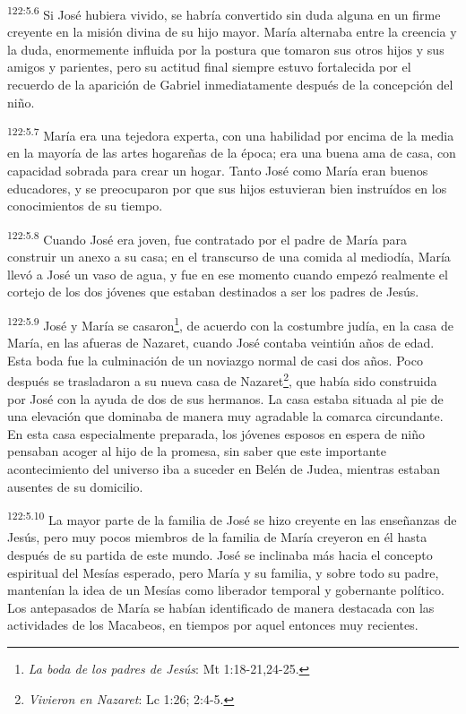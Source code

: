 \par
\textsuperscript{122:5.6} Si José hubiera vivido, se habría convertido sin duda alguna en un firme creyente en la misión divina de su hijo mayor. María alternaba entre la creencia y la duda, enormemente influida por la postura que tomaron sus otros hijos y sus amigos y parientes, pero su actitud final siempre estuvo fortalecida por el recuerdo de la aparición de Gabriel inmediatamente después de la concepción del niño.

\par
\textsuperscript{122:5.7} María era una tejedora experta, con una habilidad por encima de la media en la mayoría de las artes hogareñas de la época; era una buena ama de casa, con capacidad sobrada para crear un hogar. Tanto José como María eran buenos educadores, y se preocuparon por que sus hijos estuvieran bien instruídos en los conocimientos de su tiempo.

\par
\textsuperscript{122:5.8} Cuando José era joven, fue contratado por el padre de María para construir un anexo a su casa; en el transcurso de una comida al mediodía, María llevó a José un vaso de agua, y fue en ese momento cuando empezó realmente el cortejo de los dos jóvenes que estaban destinados a ser los padres de Jesús.

\par
\textsuperscript{122:5.9} José y María se casaron\footnote{\textit{La boda de los padres de Jesús}: Mt 1:18-21,24-25.}, de acuerdo con la costumbre judía, en la casa de María, en las afueras de Nazaret, cuando José contaba veintiún años de edad. Esta boda fue la culminación de un noviazgo normal de casi dos años. Poco después se trasladaron a su nueva casa de Nazaret\footnote{\textit{Vivieron en Nazaret}: Lc 1:26; 2:4-5.}, que había sido construida por José con la ayuda de dos de sus hermanos. La casa estaba situada al pie de una elevación que dominaba de manera muy agradable la comarca circundante. En esta casa especialmente preparada, los jóvenes esposos en espera de niño pensaban acoger al hijo de la promesa, sin saber que este importante acontecimiento del universo iba a suceder en Belén de Judea, mientras estaban ausentes de su domicilio.

\par
\textsuperscript{122:5.10} La mayor parte de la familia de José se hizo creyente en las enseñanzas de Jesús, pero muy pocos miembros de la familia de María creyeron en él hasta después de su partida de este mundo. José se inclinaba más hacia el concepto espiritual del Mesías esperado, pero María y su familia, y sobre todo su padre, mantenían la idea de un Mesías como liberador temporal y gobernante político. Los antepasados de María se habían identificado de manera destacada con las actividades de los Macabeos, en tiempos por aquel entonces muy recientes.

